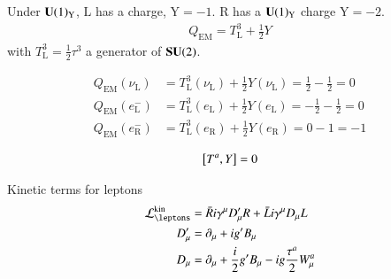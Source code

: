 Under $\mathbf{U}(1)_\text{Y}$, $\text{L}$ has a charge, $\text{Y} = -1$. $\text{R}$ has a $\mathbf{U}(1)_{\text{Y}}$ charge $\text{Y} = -2$.
\begin{align*}
   Q_{\text{EM}} = T^3_\text{L} + \frac{1}{2} Y
\end{align*}
with $T^3_\text{L} = \frac{1}{2} \tau^3$ a generator of $\mathbf{SU}(2)$.

\begin{align*}
   Q_{\text{EM}}(\nu_\text{L}) &= T^3_\text{L}(\nu_\text{L}) + \frac{1}{2} Y(\nu_\text{L}) = \frac{1}{2} - \frac{1}{2} = 0 \\
   Q_{\text{EM}}(e^-_\text{L}) &= T^3_\text{L}(e_\text{L}) + \frac{1}{2} Y(e_\text{L}) = -\frac{1}{2} - \frac{1}{2} = 0 \\
   Q_{\text{EM}}(e^-_\text{R}) &= T^3_\text{L}(e_\text{R}) + \frac{1}{2} Y(e_\text{R}) = 0 - 1 = -1
\end{align*}

\begin{align}
   \comm{T^a}{Y} = 0
\end{align}

Kinetic terms for leptons
\begin{align}
   \lag_{\text{\leptons}}^{\text{kin}} &= \bar{R} i \gamma^\mu D'_\mu R + \bar{L} i \gamma^\mu D_\mu L \\
   D'_\mu &= \partial_\mu + ig' B_\mu \\
   D_\mu &= \partial_\mu + \frac{i}{2} g' B_\mu - ig \frac{\tau^a}{2} W_\mu^a
\end{align}

